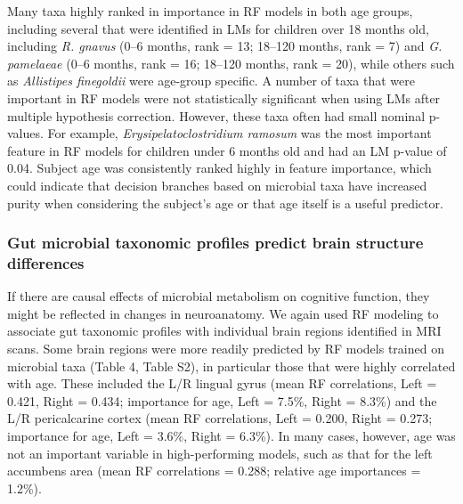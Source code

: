 \documentclass{article}
\begin{document}
Many taxa highly ranked in importance in RF models in both age
groups, including several that were identified in LMs for children over
18 months old, including \emph{R. gnavus} (0--6 months, rank = 13;
18--120 months, rank = 7) and \emph{G. pamelaeae} (0--6 months, rank =
16; 18--120 months, rank = 20), while others such as \emph{Allistipes
finegoldii} were age-group specific. A number of taxa that were important in RF models
were not statistically significant when using LMs after
multiple hypothesis correction. However, these taxa often had small nominal
p-values. For example, \emph{Erysipelatoclostridium ramosum} was the
most important feature in RF models for children under 6 months old and
had an LM p-value of 0.04. Subject age was consistently ranked highly in
feature importance, which could indicate that decision branches based on
microbial taxa have increased purity when considering the subject's age
or that age itself is a useful predictor.

\subsubsection*{Gut microbial taxonomic profiles predict brain structure differences}

If there are causal effects of microbial metabolism on cognitive
function, they might be reflected in changes in neuroanatomy. We again
used RF modeling to associate gut taxonomic
profiles with individual brain regions identified in MRI scans.
Some brain regions were more readily
predicted by RF models trained on microbial taxa (Table 4, Table S2), in particular those that were highly correlated with age.
These included the L/R lingual gyrus (mean RF correlations, Left =
0.421, Right = 0.434; importance for age, Left = 7.5\%, Right =
8.3\%) and the L/R pericalcarine cortex (mean RF correlations, Left =
0.200, Right = 0.273; importance for age, Left = 3.6\%, Right = 6.3\%).
In many cases, however, age was not an important variable in
high-performing models, such as that for the left accumbens area (mean
RF correlations = 0.288; relative age importances = 1.2\%).
\end{document}
